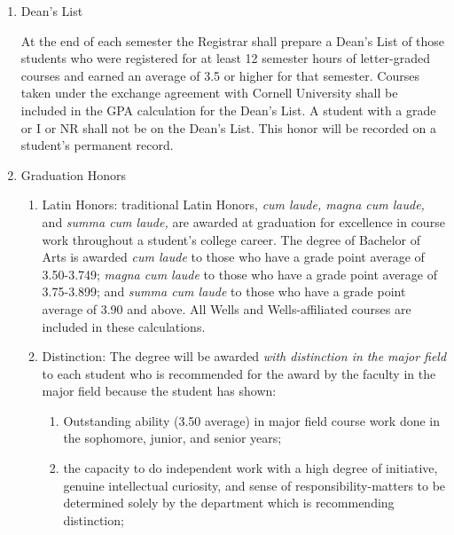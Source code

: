 \documentclass{manual}
\newcommand{\modified}[1]{}
\newcommand{\oldbreak}[1]{}
\newcommand{\editRemove}[1]{}
\newcommand{\itemLevelA}{\alph*.}
\newcommand{\itemLevelB}{\arabic*)}
\newcommand{\itemRefA}{\alph*}
\newcommand{\itemRefB}{\arabic*}
\begin{document}
\begin{enumerate}[label=\itemLevelA,ref=\itemRefA]

\item Dean's List

At the end of each semester the Registrar shall prepare a Dean's List of those students who were registered for at least 12 semester hours of letter-graded courses and earned an average of 3.5 or higher for that semester. Courses taken under the exchange agreement with Cornell University shall be included in the GPA calculation for the Dean's List. A student with a grade or I or NR shall not be on the Dean's List. This honor will be recorded on a student's permanent record.

\item Graduation Honors  \modified{5/13/97}

\begin{enumerate}[label=\itemLevelB,ref=\itemRefB]

\item Latin Honors: traditional Latin Honors, \textit{cum laude, magna cum laude, }and \textit{summa cum laude, }are awarded at graduation for excellence in course work throughout a student's college career. The degree of Bachelor of Arts is awarded \textit{cum laude }to those who have a grade point average of 3.50-3.749; \textit{magna cum laude }to those who have a grade point average of 3.75-3.899; and \textit{summa cum laude }to those who have a grade point average of 3.90 and above. All Wells and Wells-affiliated courses are included in these calculations.

\editRemove{This regulation would take effect beginning with the class graduating in May, 1998.}

\oldbreak{VII-1}

\item Distinction: The degree will be awarded \textit{with distinction in the major field }to each student who is recommended for the award by the faculty in the major field because the student has shown:

\begin{enumerate}[label=\alph*)]

\item Outstanding ability (3.50 average) in major field course work done in the sophomore, junior, and senior years;

\item the capacity to do independent work with a high degree of initiative, genuine intellectual curiosity, and sense of responsibility-matters to be determined solely by the department which is recommending distinction;


\end{enumerate}
\end{enumerate}
\end{enumerate}
\end{document}
